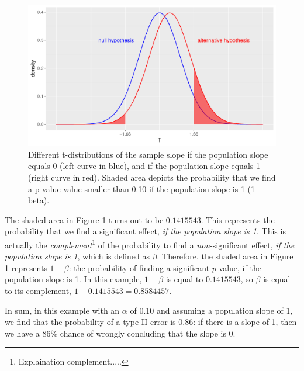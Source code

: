 \documentclass[]{book}\usepackage[]{graphicx}\usepackage[]{color}
\makeatletter
\def\maxwidth{ %
  \ifdim\Gin@nat@width>\linewidth
    \linewidth
  \else
    \Gin@nat@width
  \fi
}
\newenvironment{knitrout}{}{} %
\makeatother
\begin{document}
\begin{knitrout}
\color{fgcolor}\begin{figure}

{\centering \includegraphics[width=\maxwidth]{figure/inf_21-1} 

}

\caption[Different t-distributions of the sample slope if the population slope equals 0 (left curve in blue), and if the population slope equals 1 (right curve in red)]{Different t-distributions of the sample slope if the population slope equals 0 (left curve in blue), and if the population slope equals 1 (right curve in red). Shaded area depicts the probability that we find a p-value value smaller than 0.10 if the population slope is 1 (1-beta).}\label{fig:inf_21}
\end{figure}


\end{knitrout}

The shaded area in Figure \ref{fig:inf_21} turns out to be $0.1415543$. This represents the probability that we find a significant effect, \textit{if the population slope is 1}. This is actually the \textit{complement}\footnote{Explaination complement.....} of the probability to find a \textit{non}-significant effect, \textit{if the population slope is 1}, which is defined as $\beta$. Therefore, the shaded area in Figure \ref{fig:inf_21} represents $1- \beta$: the probability of finding a significant $p$-value, if the population slope is 1. In this example, $1-\beta$ is equal to $0.1415543$, so $\beta$ is equal to its complement, $1- 0.1415543 = 0.8584457$.

In sum, in this example with an $\alpha$ of 0.10 and assuming a population slope of 1, we find that the probability of a type II error is 0.86: if there is a slope of 1, then we have a 86\% chance of wrongly concluding that the slope is 0.
\end{document}
